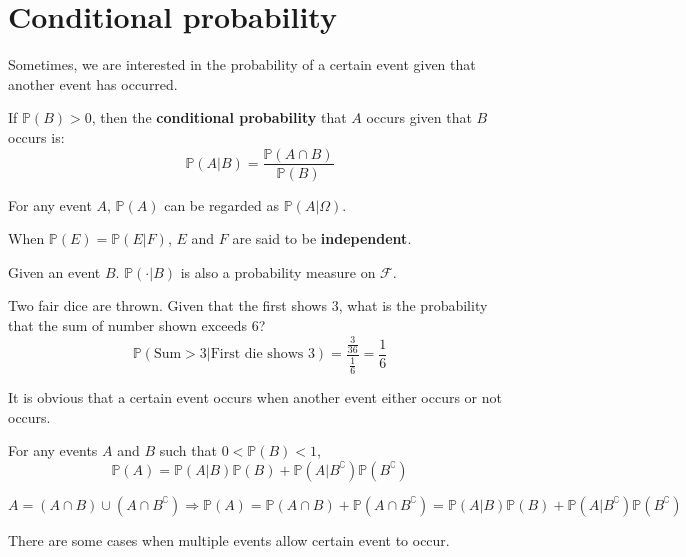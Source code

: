 \documentclass{huhtakm-template-book}
\newcommand{\prob}{\mathbb{P}}
\begin{document}
\section{Conditional probability}
    Sometimes, we are interested in the probability of a certain event given that another event has occurred.
    \begin{defn}
        If $\prob(B)>0$, then the \textbf{conditional probability} that $A$ occurs given that $B$ occurs is:
        \begin{equation*}
            \prob(A|B)=\frac{\prob(A\cap B)}{\prob(B)}
        \end{equation*}
    \end{defn}
    \begin{rem}
        For any event $A$, $\prob(A)$ can be regarded as $\prob(A|\Omega)$.
    \end{rem}
    \begin{rem}
        When $\prob(E)=\prob(E|F)$, $E$ and $F$ are said to be \textbf{independent}.
    \end{rem}
    \begin{rem}
        Given an event $B$. $\prob(\cdot |B)$ is also a probability measure on $\mathcal{F}$.
    \end{rem}
    \begin{eg}
        Two fair dice are thrown. Given that the first shows $3$, what is the probability that the sum of number shown exceeds $6$?
        \begin{equation*}
            \prob(\text{Sum}>3|\text{First die shows }3)=\frac{\frac{3}{36}}{\frac{1}{6}}=\frac{1}{6}
        \end{equation*}
    \end{eg}
    It is obvious that a certain event occurs when another event either occurs or not occurs.
    \begin{lem}
        For any events $A$ and $B$ such that $0<\prob(B)<1$,
        \begin{equation*}
            \prob(A)=\prob(A|B)\prob(B)+\prob(A|B^{\complement})\prob(B^{\complement})
        \end{equation*}
    \end{lem}
    \begin{proofing}
        $A=(A\cap B)\cup(A\cap B^{\complement})\Longrightarrow\prob(A)=\prob(A\cap B)+\prob(A\cap B^{\complement})=\prob(A|B)\prob(B)+\prob(A|B^{\complement})\prob(B^{\complement})$
    \end{proofing}
    There are some cases when multiple events allow certain event to occur.
\end{document}
